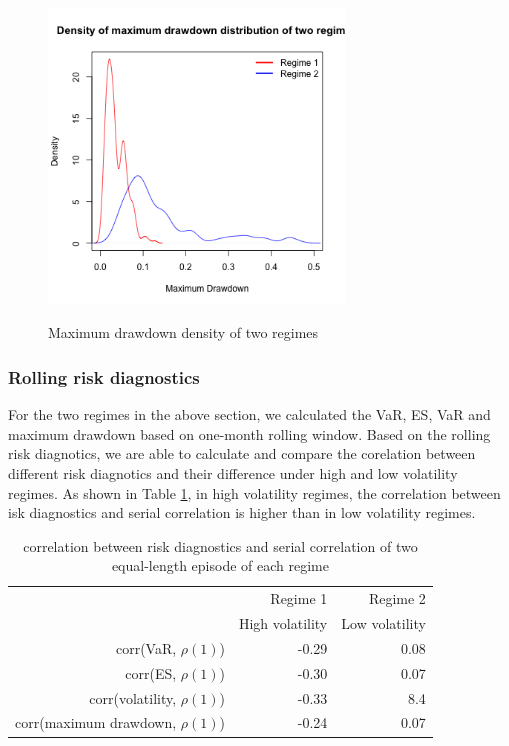 \documentclass[12pt]{article}
\begin{document}
\begin{figure}[h]
\caption{Maximum drawdown density of two regimes} 
\centering 
\includegraphics[width=0.7\textwidth]{../results/regime/RMZ_mon1_mdd}
\label{fig: RMZregime_mdd}
\end{figure}

\subsubsection{Rolling risk diagnostics}

For the two regimes in the above section, we calculated the VaR, ES, VaR and maximum drawdown based on one-month rolling window. Based on the rolling risk diagnotics, we are able to calculate and compare the corelation between different risk diagnotics and their difference under high and low volatility regimes. As shown in Table \ref{table:corr_risk_serial_regime}, in high volatility regimes, the correlation between isk diagnostics and serial correlation is higher than in low volatility regimes.

\begin{table}[!h]
\caption{correlation between risk diagnostics and serial correlation of two equal-length episode of each regime} 
\centering 
\begin{tabular}{| r | r | r |} 
 \hline
& Regime 1 & Regime 2 \\
& High volatility & Low volatility \\
 \hline 
corr(VaR, $\rho(1)$)  & -0.29 & 0.08 \\
corr(ES, $\rho(1)$)   & -0.30 & 0.07 \\
corr(volatility, $\rho(1)$)  & -0.33 & 8.4 \\
corr(maximum drawdown, $\rho(1)$)  & -0.24 & 0.07 \\
 \hline
\end{tabular}
\label{table:corr_risk_serial_regime}
\end{table}

\iffalse
\end{document}

